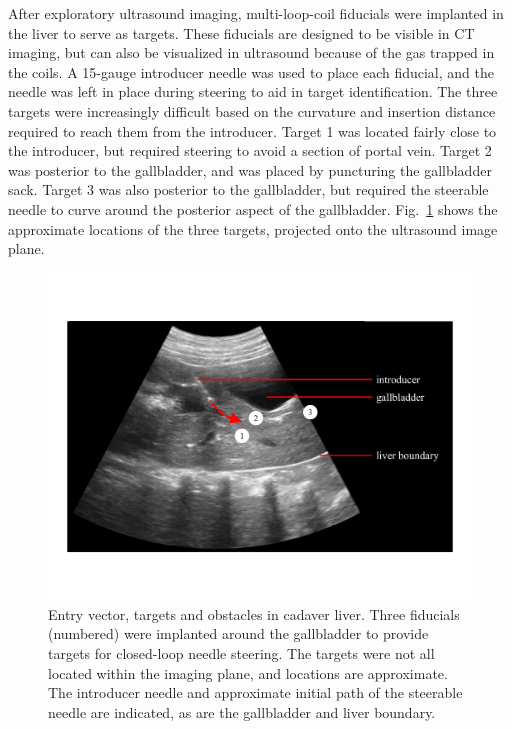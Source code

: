 After exploratory ultrasound imaging, multi-loop-coil fiducials were implanted in the liver to serve as targets. These fiducials are designed to be visible in CT imaging, but can also be visualized in ultrasound because of the gas trapped in the coils. A 15-gauge introducer needle was used to place each fiducial, and the needle was left in place during steering to aid in target identification. The three targets were increasingly difficult based on the curvature and insertion distance required to reach them from the introducer. Target 1 was located fairly close to the introducer, but required steering to avoid a section of portal vein. Target 2 was posterior to the gallbladder, and was placed by puncturing the gallbladder sack. Target 3 was also posterior to the gallbladder, but required the steerable needle to curve around the posterior aspect of the gallbladder. Fig.~\ref{fig:CadaverTargetsUS} shows the approximate locations of the three targets, projected onto the ultrasound image plane.

\begin{figure}[!t]
\centering
\includegraphics[width = \columnwidth]{./Images/Chapter5/CadaverTargetsUS/CadaverTargetsUS.pdf}%
\caption[Entry vector, targets and obstacles in cadaver liver]{Entry vector, targets and obstacles in cadaver liver. Three fiducials (numbered) were implanted around the gallbladder to provide targets for closed-loop needle steering. The targets were not all located within the imaging plane, and locations are approximate. The introducer needle and approximate initial path of the steerable needle are indicated, as are the gallbladder and liver boundary. }
\label{fig:CadaverTargetsUS}
\end{figure} 

